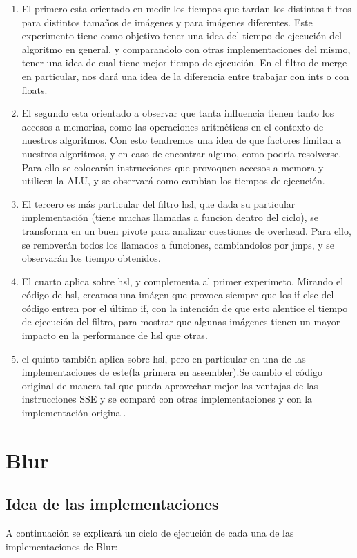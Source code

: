 \documentclass[a4paper]{article}
\begin{document}
\begin{enumerate}
	\item El primero esta orientado en medir los tiempos que tardan los distintos filtros para distintos tamaños de imágenes y para imágenes diferentes. Este experimento tiene como objetivo tener una idea del tiempo de ejecución del algoritmo en general, y comparandolo con otras implementaciones del mismo, tener una idea de cual tiene mejor tiempo de ejecución. En el filtro de merge en particular, nos dará una idea de la diferencia entre trabajar con ints o con floats.
	\item El segundo esta orientado a observar que tanta influencia tienen tanto los accesos a memorias, como las operaciones aritméticas en el contexto de nuestros algoritmos. Con esto tendremos una idea de que factores limitan a nuestros algoritmos, y en caso de encontrar alguno, como podría resolverse. Para ello se colocarán instrucciones que provoquen accesos a memora y utilicen la ALU, y se observará como cambian los tiempos de ejecución.
	\item El tercero es más particular del filtro hsl, que dada su particular implementación (tiene muchas llamadas a funcion dentro del ciclo), se transforma en un buen pivote para analizar cuestiones de overhead. Para ello, se removerán todos los llamados a funciones, cambiandolos por jmps, y se observarán los tiempo obtenidos.
	\item El cuarto aplica sobre hsl, y complementa al primer experimeto. Mirando el código de hsl, creamos una imágen que provoca siempre que los if else del código entren por el último if, con la intención de que esto alentice el tiempo de ejecución del filtro, para mostrar que algunas imágenes tienen un mayor impacto en la performance de hsl que otras.
	\item el quinto también aplica sobre hsl, pero en particular en una de las implementaciones de este(la primera en assembler).Se cambio el código original de manera tal que pueda aprovechar mejor las ventajas de las instrucciones SSE y se comparó con otras implementaciones y con la implementación original. 
\end{enumerate}

\newpage

\section{Blur}

\subsection{Idea de las implementaciones}
A continuación se explicará un ciclo de ejecución de cada una de las implementaciones de Blur:
\end{document}

